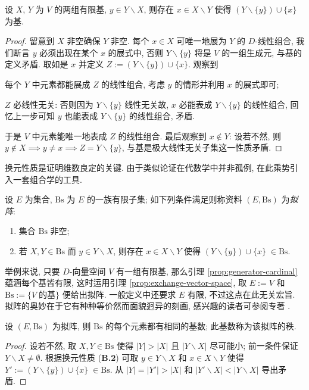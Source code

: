 \begin{lemma}\label{prop:exchange-vector-space}
	设 $X$, $Y$ 为 $V$ 的两组有限基, $y \in Y \smallsetminus X$, 则存在 $x \in X \smallsetminus Y$ 使得 $(Y \smallsetminus \{y\}) \cup \{x\}$ 为基.
\end{lemma}
\begin{proof}
	留意到 $X$ 非空确保 $Y$ 非空. 每个 $x \in X$ 可唯一地展为 $Y$ 的 $D$-线性组合, 我们断言 $y$ 必须出现在某个 $x$ 的展式中, 否则 $Y \smallsetminus \{y\}$ 将是 $V$ 的一组生成元, 与基的定义矛盾. 取如是 $x$ 并定义 $Z := (Y \smallsetminus \{y\}) \cup \{x\}$. 观察到
	\begin{inparaenum}[(a)]
		\item 每个 $Y$ 中元素都能展成 $Z$ 的线性组合, 考虑 $y$ 的情形并利用 $x$ 的展式即可;
		\item $Z$ 必线性无关: 否则因为 $Y \smallsetminus \{y\}$ 线性无关故, $x$ 必能表成 $Y \smallsetminus \{y\}$ 的线性组合, 回忆上一步可知 $y$ 也能表成 $Y \smallsetminus \{y\}$ 的线性组合, 矛盾.
	\end{inparaenum}
	于是 $V$ 中元素能唯一地表成 $Z$ 的线性组合. 最后观察到 $x \notin Y$: 设若不然, 则 $y \notin X \implies y \neq x \implies Z = Y \smallsetminus \{y\}$, 与基是极大线性无关子集这一性质矛盾.
\end{proof}

换元性质是证明维数良定的关键. 由于类似论证在代数学中并非孤例, 在此乘势引入一套组合学的工具.
\begin{definition}[H.\ Whitney]\label{def:matroid}
	设 $E$ 为集合, $\text{Bs}$ 为 $E$ 的一族有限子集; 如下列条件满足则称资料 $(E, \text{Bs})$ 为\emph{拟阵}:
	\begin{enumerate}[\bfseries {B}.1]
		\item 集合 $\text{Bs}$ 非空;
		\item 若 $X, Y \in \text{Bs}$ 而 $y \in Y \smallsetminus X$, 则存在 $x \in X \smallsetminus Y$ 使得 $(Y \smallsetminus \{y\}) \cup \{x\}\; \in \text{Bs}$.
	\end{enumerate}
\end{definition}
举例来说, 只要 $D$-向量空间 $V$ 有一组有限基, 那么引理 \ref{prop:generator-cardinal} 蕴涵每个基皆有限, 这时运用引理 \ref{prop:exchange-vector-space}, 取 $E := V$ 和 $\text{Bs} := \{ V\;\text{的基} \}$ 便给出拟阵. 一般定义中还要求 $E$ 有限, 不过这点在此无关宏旨. 拟阵的奥妙在于它有种种等价然而面貌迥异的刻画, 感兴趣的读者可参阅专著 \cite{Oxl11}. 

\begin{proposition}\label{prop:matroid-rank}
	设 $(E, \mathrm{Bs})$ 为拟阵, 则 $\mathrm{Bs}$ 的每个元素都有相同的基数; 此基数称为该拟阵的秩.
\end{proposition}
\begin{proof}
	设若不然, 取 $X, Y \in \text{Bs}$ 使得 $|Y| > |X|$ 且 $|Y \smallsetminus X|$ 尽可能小; 前一条件保证 $Y \smallsetminus X \neq \emptyset$. 根据换元性质 (\textbf{B.2}) 可取 $y \in Y \smallsetminus X$ 和 $x \in X \smallsetminus Y$ 使得 $Y' := (Y \smallsetminus \{y\}) \cup \{x\}\; \in \text{Bs}$. 从 $|Y|=|Y'| > |X|$ 和 $|Y' \smallsetminus X| < |Y \smallsetminus X|$ 导出矛盾.
\end{proof}

